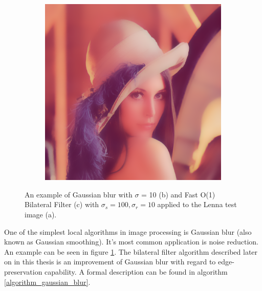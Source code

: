 \documentclass [12pt,a4paper]{report}
\begin{document}
\begin{figure}[h]
\begin{subfigure}{.5\textwidth}
  \caption{}
\end{subfigure}
\\
\\
\begin{subfigure}{1.0\textwidth}
  \centering
  \includegraphics[scale=0.3]{Lenna_bf_100_10.eps} %
  \caption{}
\end{subfigure}
\caption[An example of Gaussian blur and bilateral filter]{An example of Gaussian blur with $\sigma$ = 10 (b) and Fast O(1) Bilateral Filter (c) with $\sigma_s=100, \sigma_r=10$ applied to the Lenna test image (a)\cite{lenna}. \label{fig_gaussian_blur} }
\end{figure}

One of the simplest local algorithms in image processing is Gaussian blur (also known as Gaussian smoothing). It's most common application is noise reduction. An example can be seen in figure \ref{fig_gaussian_blur}. The bilateral filter algorithm described later on in this thesis is an improvement of Gaussian blur with regard to edge-preservation capability. A formal description can be found in algorithm \ref{algorithm_gaussian_blur}.
\end{document}
